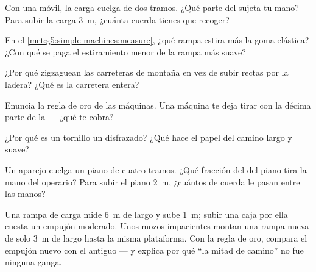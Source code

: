 \begin{exercise}[$\star$]\label{exo:g5:simple-machines:4}
Con una  móvil, la carga cuelga de dos tramos. ¿Qué parte del
 sujeta tu mano? Para subir la carga \qty{3}{m}, ¿cuánta cuerda
tienes que recoger?
\end{exercise}

\begin{exercise}[$\star$]\label{exo:g5:simple-machines:5}
En el \cref{met:g5:simple-machines:measure}, ¿qué rampa estira más la
goma elástica? ¿Con qué se paga el estiramiento menor de la rampa más
suave?
\end{exercise}

\begin{exercise}[$\star$]\label{exo:g5:simple-machines:6}
¿Por qué zigzaguean las carreteras de montaña en vez de subir rectas
por la ladera? ¿Qué  es la carretera entera?
\end{exercise}

\begin{exercise}[$\star$]\label{exo:g5:simple-machines:7}
Enuncia la regla de oro de las máquinas. Una máquina te deja tirar con
la décima parte de la  --- ¿qué te cobra?
\end{exercise}

\begin{exercise}[$\star$]\label{exo:g5:simple-machines:8}
¿Por qué es un tornillo un  disfrazado? ¿Qué hace el
papel del camino largo y suave?
\end{exercise}

\begin{exercise}[$\star\star$]\label{exo:g5:simple-machines:9}
Un aparejo cuelga un piano de cuatro tramos. ¿Qué fracción del
 del piano tira la mano del operario? Para subir el piano
\qty{2}{m}, ¿cuántos  de cuerda le pasan entre las manos?
\end{exercise}

\begin{exercise}[$\star\star$]\label{exo:g5:simple-machines:10}
Una rampa de carga mide \qty{6}{m} de largo y sube \qty{1}{m}; subir
una caja por ella cuesta un empujón moderado. Unos mozos impacientes
montan una rampa nueva de solo \qty{3}{m} de largo hasta la misma
plataforma. Con la regla de oro, compara el empujón nuevo con el
antiguo --- y explica por qué ``la mitad de camino'' no fue ninguna
ganga.
\end{exercise}

